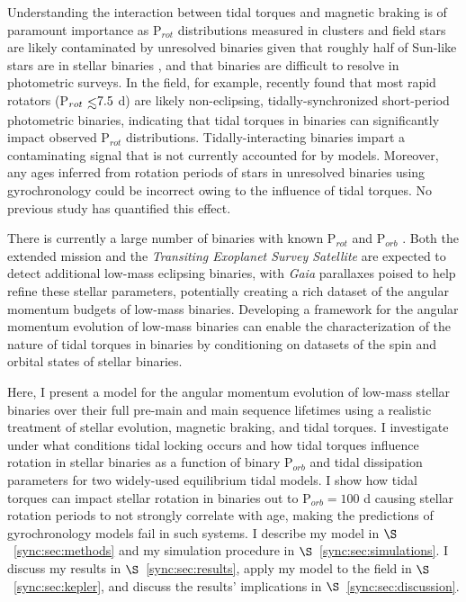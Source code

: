 Understanding the interaction between tidal torques and magnetic braking is of paramount importance as P$_{rot}$ distributions measured in clusters \citep[e.g. Praesepe, ][]{Agueros2011,Douglas2017} and field stars \citep[e.g. \kepler, ][]{Reinhold2013,McQuillan2014} are likely contaminated by unresolved binaries given that roughly half of Sun-like stars are in stellar binaries \citep{Raghavan2010,Duchene2013}, and that binaries are difficult to resolve in photometric surveys. In the \kepler field, for example, \citet{Simonian2018} recently found that most rapid rotators (P$_{rot} \lsim 7.5$ d) are likely non-eclipsing, tidally-synchronized short-period photometric binaries, indicating that tidal torques in binaries can significantly impact observed P$_{rot}$ distributions.  Tidally-interacting binaries impart a contaminating signal that is not currently accounted for by models. Moreover, any ages inferred from rotation periods of stars in unresolved binaries using gyrochronology could be incorrect owing to the influence of tidal torques. No previous study has quantified this effect. 

There is currently a large number of \kepler binaries with known P$_{rot}$ and P$_{orb}$ \citep[e.g.][]{Lurie2017}. Both the extended \kepler mission \citep[K2,][]{Howell2014} and the \textit{Transiting Exoplanet Survey Satellite} \citep[\textit{TESS}, ][]{Ricker2014,Sullivan2015} are expected to detect additional low-mass eclipsing binaries, with \textit{Gaia} parallaxes \citep{Gaia2016} poised to help refine these stellar parameters, potentially creating a rich dataset of the angular momentum budgets of low-mass binaries. Developing a framework for the angular momentum evolution of low-mass binaries can enable the characterization of the nature of tidal torques in binaries by conditioning on datasets of the spin and orbital states of stellar binaries.

Here, I present a model for the angular momentum evolution of low-mass stellar binaries over their full pre-main and main sequence lifetimes using a realistic treatment of stellar evolution, magnetic braking, and tidal torques. I investigate under what conditions tidal locking occurs and how tidal torques influence rotation in stellar binaries as a function of binary P$_{orb}$ and tidal dissipation parameters for two widely-used equilibrium tidal models.  I show how tidal torques can impact stellar rotation in binaries out to P$_{orb} = 100$ d causing stellar rotation periods to not strongly correlate with age, making the predictions of gyrochronology models fail in such systems.  I describe my model in $\S$~\ref{sync:sec:methods} and my simulation procedure in $\S$~\ref{sync:sec:simulations}.  I discuss my results in $\S$~\ref{sync:sec:results}, apply my model to the \kepler field in $\S$~\ref{sync:sec:kepler}, and discuss the results' implications in $\S$~\ref{sync:sec:discussion}.

